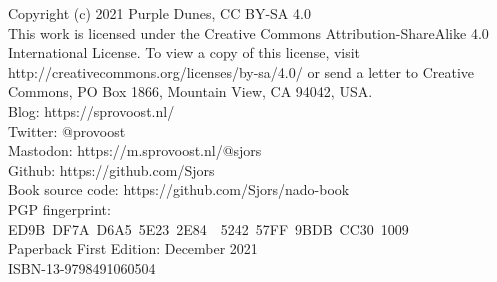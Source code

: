 Copyright (c) 2021 Purple Dunes, CC BY-SA 4.0\\

This work is licensed under the Creative Commons Attribution-ShareAlike 4.0 International License. To view a copy of this license, visit http://creativecommons.org/licenses/by-sa/4.0/ or send a letter to Creative Commons, PO Box 1866, Mountain View, CA 94042, USA.\\

Blog: https://sprovoost.nl/\\

Twitter: @provoost\\

Mastodon: https://m.sprovoost.nl/@sjors\\

Github: https://github.com/Sjors\\

Book source code: https://github.com/Sjors/nado-book\\

PGP fingerprint: ED9B DF7A D6A5 5E23 2E84  5242 57FF 9BDB CC30 1009\\

Paperback First Edition: December 2021\\

ISBN-13-9798491060504\\

\newpage
